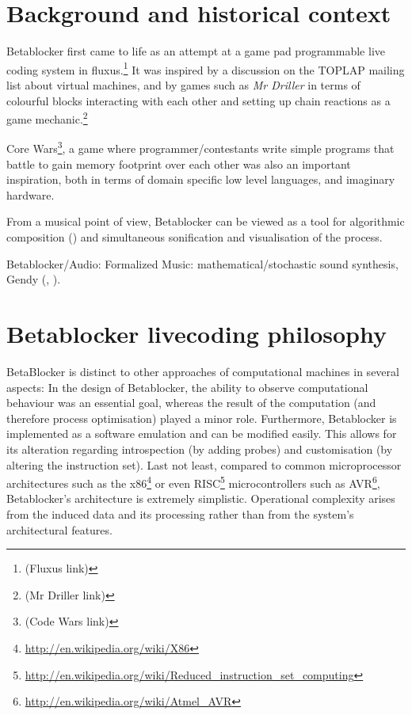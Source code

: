 \documentclass[letterpaper, 12pt]{article}
\begin{document}
\section{Background and historical context} 
\label{sec:background}


Betablocker first came to life as an attempt at a game pad programmable live coding system in fluxus.\footnote{
(Fluxus link)
} 
It was inspired by a discussion on the TOPLAP mailing list about virtual machines, and by games such as \emph{Mr Driller} in terms of colourful blocks interacting with each other and setting up chain reactions as a game mechanic.\footnote{
(Mr Driller link)
}
 
Core Wars\footnote{
(Code Wars link)
}, a game where programmer/contestants write simple programs that battle to gain memory footprint over each other was also an important inspiration, both in terms of domain specific low level languages, and imaginary hardware.

From a musical point of view, Betablocker can be viewed as a tool for algorithmic composition (\cite{maurer1999-a-b}) and simultaneous sonification and visualisation of the process.

Betablocker/Audio: Formalized Music: mathematical/stochastic sound synthesis, Gendy (\cite{Xenakis:1971}, \cite{luque2009-the}).



\section{Betablocker livecoding philosophy}
\label{sec:distinct_character}



BetaBlocker is distinct to other approaches of computational machines in several aspects:
In the design of Betablocker, the ability to observe computational behaviour was an essential goal, whereas the result of the computation (and therefore process optimisation) played a minor role.  
Furthermore, Betablocker is implemented as a software emulation and can be modified easily.
This allows for its alteration regarding introspection (by adding probes) and customisation (by altering the instruction set).
Last not least, compared to common microprocessor architectures such as the x86\footnote{\url{http://en.wikipedia.org/wiki/X86}} or even RISC\footnote{\url{http://en.wikipedia.org/wiki/Reduced_instruction_set_computing}} microcontrollers such as AVR\footnote{\url{http://en.wikipedia.org/wiki/Atmel_AVR}}, Betablocker's architecture is extremely simplistic.
Operational complexity arises from the induced data and its processing rather than from the system's architectural features.
\end{document}
